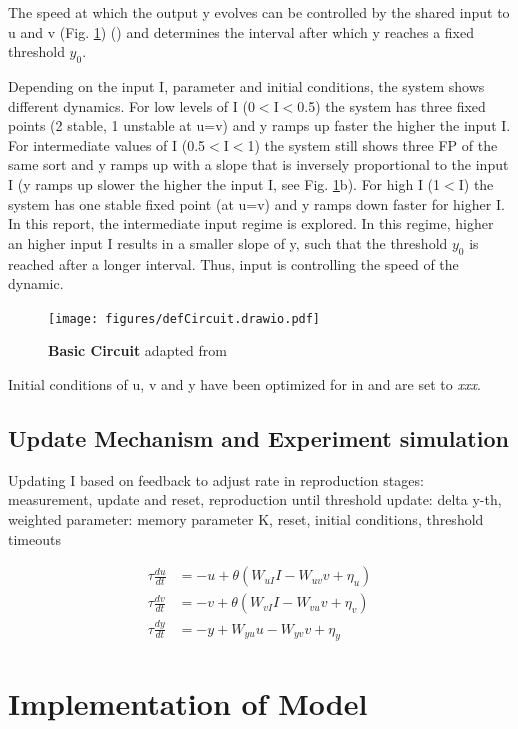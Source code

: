 \documentclass[9pt]{article}
\begin{document}
The speed at which the output y evolves can be controlled by the shared input to u and v (Fig. \ref{fig:circuit}) (\cite{Egger2020}) and determines the interval after which y reaches a fixed threshold $y_0$.

Depending on the input I, parameter and initial conditions, the system shows different dynamics. For low levels of I (0$<$I$<$0.5) the system has three fixed points (2 stable, 1 unstable at u=v) and y ramps up faster the higher the input I. 
For intermediate values of I (0.5$<$I$<$1) the system still shows three FP of the same sort and y ramps up with a slope that is inversely proportional to the input I (y ramps up slower the higher the input I, see Fig. \ref{fig:circuit}b). 
For high I (1$<$I) the system has one stable fixed point (at u=v) and y ramps down faster for higher I.
In this report, the intermediate input regime is explored. In this regime, higher an higher input I results in a smaller slope of y, such that the threshold $y_0$ is reached after a longer interval. Thus, input is controlling the speed of the dynamic. 

\begin{figure}[h]
	\centering
	\texttt{[image: figures/defCircuit.drawio.pdf]}
	\caption{\textbf{Basic Circuit} adapted from \cite{Egger2020}}
\label{fig:circuit}
\end{figure}


Initial conditions of u, v and y have been optimized for in \cite{Egger2020} and are set to \textit{xxx}.

\subsection{Update Mechanism and Experiment simulation}
Updating I based on feedback to adjust rate in reproduction
stages: measurement, update and reset, reproduction until threshold 
update: delta y-th, weighted
parameter: memory parameter K, reset, initial conditions, 
threshold 
timeouts

\begin{align} \label{circuit}
	\tau\frac{du}{dt} & = -u + \theta(W_{uI}I - W_{uv}v + \eta_u) \\
	\tau\frac{dv}{dt} & = -v + \theta(W_{vI}I - W_{vu}v + \eta_v) \\
	\tau\frac{dy}{dt} & = -y + W_{yu}u - W_{yv}v + \eta_y
\end{align}

\section{Implementation of Model}
\end{document}
